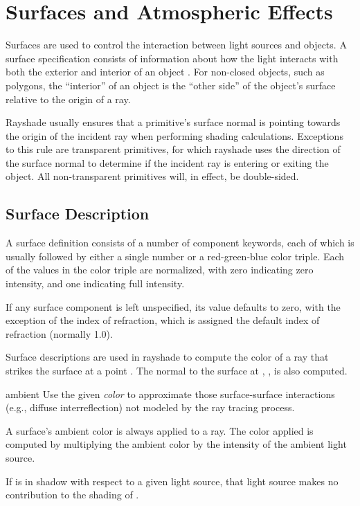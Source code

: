 \chapter{Surfaces and Atmospheric Effects}

Surfaces are used to control the interaction between light sources and
objects.  A surface specification consists of information
about how the light interacts with both the exterior and
interior of an object .
For non-closed objects, such as polygons,
the ``interior'' of an object is the ``other side'' of the object's surface
relative to the origin of a ray.

Rayshade usually ensures that a primitive's surface normal is pointing
towards the origin of the incident ray when performing shading
calculations.  Exceptions to this rule are transparent primitives, for
which rayshade uses the direction of the surface normal to determine if
the incident ray is entering or exiting the object.
All non-transparent primitives will, in effect, be double-sided.

\section{Surface Description}

A surface definition consists of a number of component keywords, each
of which is usually followed by either a single number or a red-green-blue
color triple.   Each of the values in the color triple are normalized,
with zero indicating zero intensity, and one indicating full intensity.

If any surface component is left unspecified, its value defaults to zero,
with the exception of the index of refraction, which is assigned the
default index of refraction (normally 1.0).

Surface descriptions are used in rayshade to compute the color of a ray
that strikes the surface at a point . The normal to the surface
at , , is also computed.

\begin{defkey}{ambient}{}
	Use the given {\em color} to approximate those surface-surface 
	interactions (e.g., diffuse interreflection) not modeled by the
	ray tracing process.
\end{defkey}
A surface's ambient color is always applied to a ray.  The color
applied is computed by multiplying the ambient color by the intensity
of the ambient light source.

If  is in shadow with respect to a given light source,
that light source makes no contribution to the shading of .

